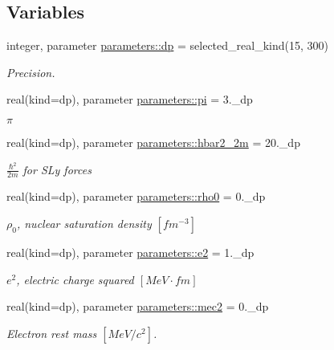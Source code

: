 \subsection*{Variables}
\begin{DoxyCompactItemize}
\item 
integer, parameter \mbox{\hyperlink{namespaceparameters_a52f8c6351fd79345d8811e065bcbbb37}{parameters\+::dp}} = selected\+\_\+real\+\_\+kind(15, 300)
\begin{DoxyCompactList}\small\item\em Precision. \end{DoxyCompactList}\item 
real(kind=dp), parameter \mbox{\hyperlink{group__CONSTANTS_ga399aac088b57a76a8a5a3784448ba3cf}{parameters\+::pi}} = 3.\+\_\+dp
\begin{DoxyCompactList}\small\item\em $\pi$ \end{DoxyCompactList}\item 
real(kind=dp), parameter \mbox{\hyperlink{group__CONSTANTS_gad4b06975615fad2c991376a975fd08f1}{parameters\+::hbar2\+\_\+2m}} = 20.\+\_\+dp
\begin{DoxyCompactList}\small\item\em $\frac{\hbar^2}{2m}$ for S\+Ly forces \end{DoxyCompactList}\item 
real(kind=dp), parameter \mbox{\hyperlink{group__CONSTANTS_ga0796781a51dc993c4b563f7ac404c641}{parameters\+::rho0}} = 0.\+\_\+dp
\begin{DoxyCompactList}\small\item\em $\rho_0$, nuclear saturation density $[fm^{-3}]$ \end{DoxyCompactList}\item 
real(kind=dp), parameter \mbox{\hyperlink{group__CONSTANTS_gaafa6a6262bc00c89fb3d403241497d22}{parameters\+::e2}} = 1.\+\_\+dp
\begin{DoxyCompactList}\small\item\em $e^2$, electric charge squared $[MeV\cdot fm]$ \end{DoxyCompactList}\item 
real(kind=dp), parameter \mbox{\hyperlink{group__CONSTANTS_ga8b91e60e1e7c4b066cc282415c740bc9}{parameters\+::mec2}} = 0.\+\_\+dp
\begin{DoxyCompactList}\small\item\em Electron rest mass $[MeV/c^2]$. \end{DoxyCompactList}\item 

\end{DoxyCompactItemize}
